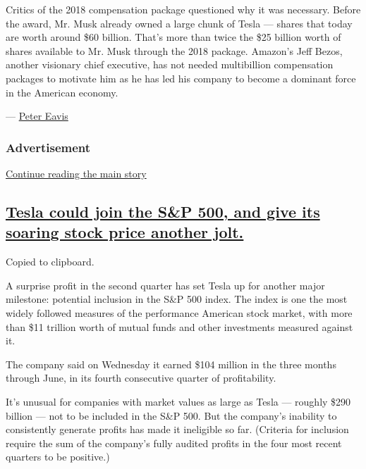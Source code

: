 Critics of the 2018 compensation package questioned why it was
necessary. Before the award, Mr. Musk already owned a large chunk of
Tesla --- shares that today are worth around \$60 billion. That's more
than twice the \$25 billion worth of shares available to Mr. Musk
through the 2018 package. Amazon's Jeff Bezos, another visionary chief
executive, has not needed multibillion compensation packages to motivate
him as he has led his company to become a dominant force in the American
economy.

--- \href{https://www.nytimes.com/by/peter-eavis}{Peter Eavis}

\hypertarget{advertisement}{%
\subsubsection{Advertisement}\label{advertisement}}

\protect\hyperlink{after-dfp-ad-mid1}{Continue reading the main story}

\hypertarget{tesla-could-join-the-sp-500-and-give-its-soaring-stock-price-another-jolt}{%
\subsection{\texorpdfstring{\protect\hyperlink{tesla-s-and-p-500}{Tesla
could join the S\&P 500, and give its soaring stock price another
jolt.}}{Tesla could join the S\&P 500, and give its soaring stock price another jolt.}}\label{tesla-could-join-the-sp-500-and-give-its-soaring-stock-price-another-jolt}}

Copied to clipboard.

A surprise profit in the second quarter has set Tesla up for another
major milestone: potential inclusion in the S\&P 500 index. The index is
one the most widely followed measures of the performance American stock
market, with more than \$11 trillion worth of mutual funds and other
investments measured against it.

The company said on Wednesday it earned \$104 million in the three
months through June, in its fourth consecutive quarter of profitability.

It's unusual for companies with market values as large as Tesla ---
roughly \$290 billion --- not to be included in the S\&P 500. But the
company's inability to consistently generate profits has made it
ineligible so far. (Criteria for inclusion require the sum of the
company's fully audited profits in the four most recent quarters to be
positive.)

